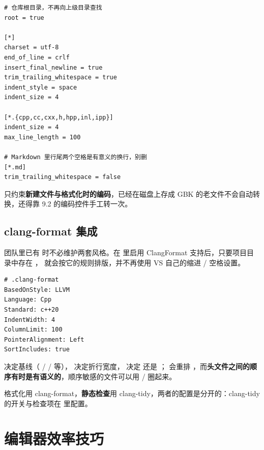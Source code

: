 \begin{lstlisting}[style=inistyle]
# 仓库根目录，不再向上级目录查找
root = true

[*]
charset = utf-8
end_of_line = crlf
insert_final_newline = true
trim_trailing_whitespace = true
indent_style = space
indent_size = 4

[*.{cpp,cc,cxx,h,hpp,inl,ipp}]
indent_size = 4
max_line_length = 100

# Markdown 里行尾两个空格是有意义的换行，别删
[*.md]
trim_trailing_whitespace = false
\end{lstlisting}
\begin{tipbox}[提示]
 只约束\textbf{新建文件与格式化时的编码}，已经在磁盘上存成 GBK 的老文件不会自动转换，还得靠 9.2 的编码控件手工转一次。
\end{tipbox}

\subsection{clang-format 集成}

团队里已有  时不必维护两套风格。在  里启用 ClangFormat 支持后，只要项目目录中存在 ， 就会按它的规则排版，并不再使用 VS 自己的缩进 / 空格设置。

\begin{lstlisting}[style=inistyle]
# .clang-format
BasedOnStyle: LLVM
Language: Cpp
Standard: c++20
IndentWidth: 4
ColumnLimit: 100
PointerAlignment: Left
SortIncludes: true
\end{lstlisting}
\begin{warnbox}[注意]
 决定基线（ /  /  等）， 决定折行宽度， 决定  还是 ； 会重排 ，而\textbf{头文件之间的顺序有时是有语义的}，顺序敏感的文件可以用  /  圈起来。
\end{warnbox}

\begin{tipbox}[提示]
格式化用 clang-format，\textbf{静态检查}用 clang-tidy，两者的配置是分开的：clang-tidy 的开关与检查项在  里配置。
\end{tipbox}

\section{编辑器效率技巧}
